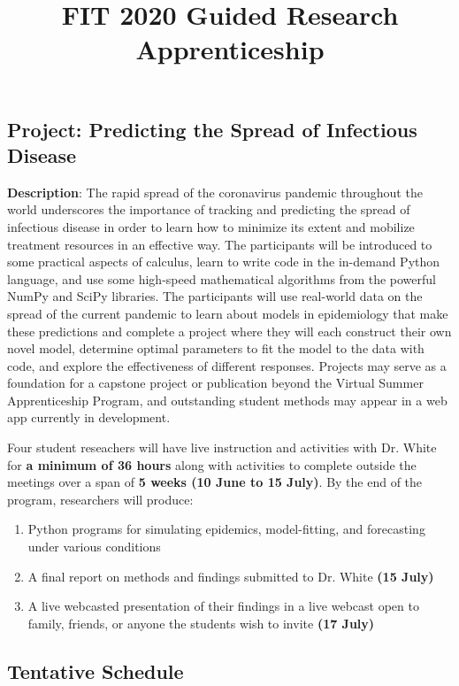 \documentclass{article}
\title{}
\title{FIT 2020 Guided Research Apprenticeship}
\date{}
\begin{document}
\maketitle
\vspace{-1.5cm}
\subsection*{Project: Predicting the Spread of Infectious Disease}

\bigskip

\textbf{Description}: The rapid spread of the coronavirus pandemic throughout the world underscores the importance of tracking and predicting the spread of infectious disease in order to learn how to minimize its extent and mobilize treatment resources in an effective way. The participants will be introduced to some practical aspects of calculus, learn to write code in the in-demand Python language, and use some high-speed mathematical algorithms from the powerful NumPy and SciPy libraries. The participants will use real-world data on the spread of the current pandemic to learn about models in epidemiology that make these predictions and complete a project where they will each construct their own novel model, determine optimal parameters to fit the model to the data with code, and explore the effectiveness of different responses. Projects may serve as a foundation for a capstone project or publication beyond the Virtual Summer Apprenticeship Program, and outstanding student methods may appear in a web app currently in development.

\bigskip

Four student reseachers will have live instruction and activities with Dr. White for \textbf{a minimum of 36 hours} along with activities to complete outside the meetings over a span of \textbf{5 weeks (10 June to 15 July)}. By the end of the program, researchers will produce:
\begin{enumerate}
\item Python programs for simulating epidemics, model-fitting, and forecasting under various conditions
\item A final report on methods and findings submitted to Dr. White \textbf{(15 July)}
\item A live webcasted presentation of their findings in a live webcast open to family, friends, or anyone the students wish to invite \textbf{(17 July)}
\end{enumerate}

\subsection*{Tentative Schedule}
\end{document}

